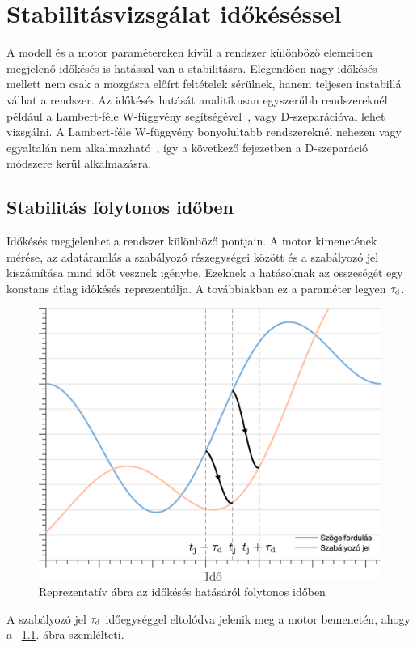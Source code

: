 \chapter{Stabilitásvizsgálat időkéséssel}\label{chap:time_delay_stability}

A modell és a motor paramétereken kívül a rendszer különböző elemeiben megjelenő időkésés 
is hatással van a stabilitásra. Elegendően nagy időkésés mellett nem csak a mozgásra előírt 
feltételek sérülnek, hanem teljesen instabillá válhat a rendszer. Az időkésés hatását analitikusan egyszerűbb 
rendszereknél például a Lambert-féle W-függvény segítségével~\citep{Yi2012, MatrixLambert2007}, 
vagy D-szeparációval lehet vizsgálni. A Lambert-féle W-függvény bonyolultabb rendszereknél nehezen 
vagy egyaltalán nem alkalmazható~\citep{CepedaGomez2015}, így a következő fejezetben a D-szeparáció módszere 
kerül alkalmazásra.

\section{Stabilitás folytonos időben}

Időkésés megjelenhet a rendszer különböző pontjain. A motor kimenetének mérése, az adatáramlás 
a szabályozó részegységei között és a szabályozó jel kiszámítása mind időt vesznek igénybe. 
Ezeknek a hatásoknak az összeségét egy konstans átlag időkésés reprezentálja. A továbbiakban ez a 
paraméter legyen \(\tau_{\mathrm{d}}\).
\begin{figure}[ht]
    \begin{center}
    \includegraphics[width=12cm]{images/time_delay_example.png}
    \caption{Reprezentatív ábra az időkésés hatásáról folytonos időben}\label{fig:time_delay_example}
    \end{center}
\end{figure}
A szabályozó jel \(\tau_{\mathrm{d}}\) időegységgel eltolódva jelenik meg a motor bemenetén, ahogy a
~\ref{fig:time_delay_example}. ábra szemlélteti.

